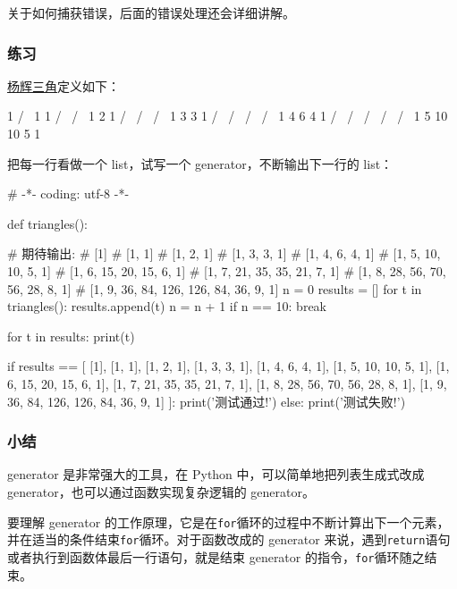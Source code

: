 关于如何捕获错误，后面的错误处理还会详细讲解。

\hypertarget{ux7ec3ux4e60}{%
\subsubsection{练习}\label{ux7ec3ux4e60}}

\href{http://baike.baidu.com/view/7804.htm}{杨辉三角}定义如下：

\begin{pythoncode}
          1
         / \
        1   1
       / \ / \
      1   2   1
     / \ / \ / \
    1   3   3   1
   / \ / \ / \ / \
  1   4   6   4   1
 / \ / \ / \ / \ / \
1   5   10  10  5   1
\end{pythoncode}

把每一行看做一个 list，试写一个 generator，不断输出下一行的 list：

\begin{pythoncode}
# -*- coding: utf-8 -*-

def triangles():
\end{pythoncode}

\begin{pythoncode}
# 期待输出:
# [1]
# [1, 1]
# [1, 2, 1]
# [1, 3, 3, 1]
# [1, 4, 6, 4, 1]
# [1, 5, 10, 10, 5, 1]
# [1, 6, 15, 20, 15, 6, 1]
# [1, 7, 21, 35, 35, 21, 7, 1]
# [1, 8, 28, 56, 70, 56, 28, 8, 1]
# [1, 9, 36, 84, 126, 126, 84, 36, 9, 1]
n = 0
results = []
for t in triangles():
    results.append(t)
    n = n + 1
    if n == 10:
        break

for t in results:
    print(t)

if results == [
    [1],
    [1, 1],
    [1, 2, 1],
    [1, 3, 3, 1],
    [1, 4, 6, 4, 1],
    [1, 5, 10, 10, 5, 1],
    [1, 6, 15, 20, 15, 6, 1],
    [1, 7, 21, 35, 35, 21, 7, 1],
    [1, 8, 28, 56, 70, 56, 28, 8, 1],
    [1, 9, 36, 84, 126, 126, 84, 36, 9, 1]
]:
    print('测试通过!')
else:
    print('测试失败!')
\end{pythoncode}

\hypertarget{ux5c0fux7ed3}{%
\subsubsection{小结}\label{ux5c0fux7ed3}}

generator 是非常强大的工具，在 Python 中，可以简单地把列表生成式改成
generator，也可以通过函数实现复杂逻辑的 generator。

要理解 generator
的工作原理，它是在\texttt{for}循环的过程中不断计算出下一个元素，并在适当的条件结束\texttt{for}循环。对于函数改成的
generator
来说，遇到\texttt{return}语句或者执行到函数体最后一行语句，就是结束
generator 的指令，\texttt{for}循环随之结束。

